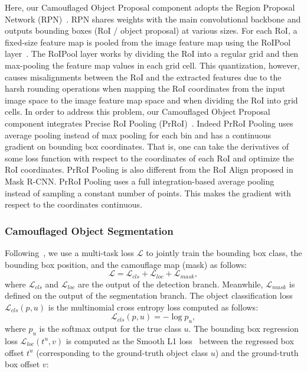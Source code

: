 \documentclass[journal]{IEEEtran}
\begin{document}
Here, our Camouflaged Object Proposal component adopts the Region Proposal Network (RPN)~\cite{Ren-NIPS2015}. RPN shares weights with the main convolutional backbone and outputs bounding boxes (RoI / object proposal) at various sizes. For each RoI, a fixed-size feature map is pooled from the image feature map using the RoIPool layer~\cite{Ren-NIPS2015}. The RoIPool layer works by dividing the RoI into a regular grid and then max-pooling the feature map values in each grid cell. This quantization, however, causes misalignments between the RoI and the extracted features due to the harsh rounding operations when mapping the RoI coordinates from the input image space to the image feature map space and when dividing the RoI into grid cells. In order to address this problem, our Camouflaged Object Proposal component integrates Precise RoI Pooling (PrRoI)~\cite{PrROI}. Indeed PrRoI Pooling uses average pooling instead of max pooling for each bin and has a continuous gradient on bounding box coordinates. That is, one can take the derivatives of some loss function with respect to the coordinates of each RoI and optimize the RoI coordinates. PrRoI Pooling is also different from the RoI Align proposed in Mask R-CNN. PrRoI Pooling uses a full integration-based average pooling instead of sampling a constant number of points. This makes the gradient with respect to the coordinates continuous.

\subsubsection{Camouflaged Object Segmentation}
Following~\cite{Ren-NIPS2015}, we use a multi-task loss $\mathcal{L}$ to jointly train the bounding box class, the bounding box position, and the camouflage map (mask) as follows:
\begin{equation}
\mathcal{L} = \mathcal{L}_{cls} + \mathcal{L}_{loc} + \mathcal{L}_{mask},
\end{equation}
where $\mathcal{L}_{cls}$ and $\mathcal{L}_{loc}$ are the output of the detection branch. Meanwhile, $\mathcal{L}_{mask}$
is defined on the output of the segmentation branch. The object classification loss $\mathcal{L}_{cls}(p, u)$ is the multinomial cross entropy loss computed as follows:
\begin{equation}
\mathcal{L}_{cls}(p, u) = -\log{p_u},
\end{equation}
where ${p_u}$ is the softmax output for the true class $u$. The bounding box regression loss $\mathcal{L}_{loc}(t^u, v)$ is computed as the Smooth L1 loss~\cite{fast} between the regressed box offset $t^u$ (corresponding to the ground-truth object class $u$) and the ground-truth box offset $v$:
\end{document}
